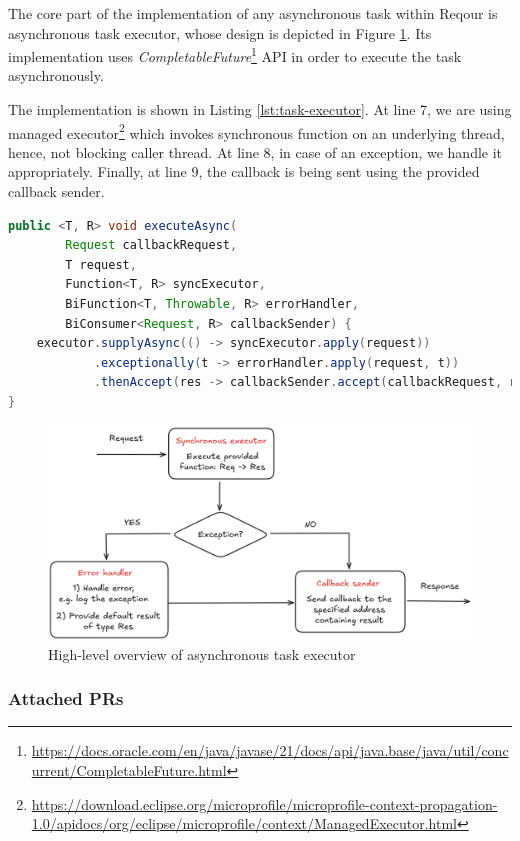 \documentclass[../main.tex]{subfiles}
\begin{document}
The core part of the implementation of any asynchronous task within Reqour is asynchronous task executor, whose design is depicted in Figure \ref{fig:task-executor}. Its implementation uses \textit{CompletableFuture}\footnote{\url{https://docs.oracle.com/en/java/javase/21/docs/api/java.base/java/util/concurrent/CompletableFuture.html}} API in order to execute the task asynchronously.

The implementation is shown in Listing \ref{lst:task-executor}. At line 7, we are using managed executor\footnote{\url{https://download.eclipse.org/microprofile/microprofile-context-propagation-1.0/apidocs/org/eclipse/microprofile/context/ManagedExecutor.html}} which invokes synchronous function on an underlying thread, hence, not blocking caller thread. At line 8, in case of an exception, we handle it appropriately. Finally, at line 9, the callback is being sent using the provided callback sender.

\begin{lstlisting}[language=Java, caption=Asynchronous task executor, label={lst:task-executor}]
public <T, R> void executeAsync(
        Request callbackRequest,
        T request,
        Function<T, R> syncExecutor,
        BiFunction<T, Throwable, R> errorHandler,
        BiConsumer<Request, R> callbackSender) {
    executor.supplyAsync(() -> syncExecutor.apply(request))
            .exceptionally(t -> errorHandler.apply(request, t))
            .thenAccept(res -> callbackSender.accept(callbackRequest, res));
}
\end{lstlisting}

\begin{figure}
  \begin{center}
    \includegraphics[width=\textwidth]{images/task-executor.png}
  \end{center}
  \caption{High-level overview of asynchronous task executor}
  \label{fig:task-executor}
\end{figure}

\subsubsection*{Attached PRs}

\end{document}
